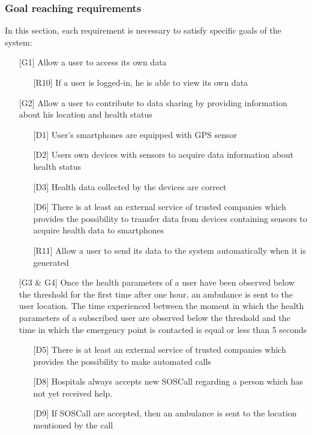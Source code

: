 \subsubsection{Goal reaching requirements}
\par
In this section, each requirement is necessary to satisfy specific goals of the system:
\begin{itemize}
\item[{[G1]}] Allow a user to access its own data
	\begin{itemize}
	\item[{[R10]}] If a user is logged-in, he is able to view its own data
	\end{itemize}
\item[{[G2]}] Allow a user to contribute to data sharing by providing information about his location and health status
	\begin{itemize}
	\item[{[D1]}]  User's smartphones are equipped with GPS sensor
	\item[{[D2]}] Users own devices with sensors to acquire data information about health status
	\item[{[D3]}] Health data collected by the devices are correct
	\item[{[D6]}] There is at least an external service of trusted companies which provides the possibility to transfer data from devices containing sensors to acquire health data to smartphones
	\item[{[R11]}] Allow a user to send its data to the system automatically when it is generated
	\end{itemize}
\item[{[G3 \& G4]}] Once the health parameters of a user have been observed 
below the threshold for the first time after one hour, an ambulance is sent to the user location. 
The time experienced between the moment in which the health parameters of a subscribed user are observed below the threshold and the time in which the emergency point is contacted is equal or less than 5 seconds
	\begin{itemize}
	\item[{[D5]}] There is at least an external service of trusted companies which provides the possibility to make automated calls
	\item[{[D8]}] Hospitals always accepts new SOSCall regarding a person which has not yet received help.
	\item[{[D9]}] If SOSCall are accepted, then an ambulance is sent to the location mentioned by the call

\end{itemize}
\end{itemize}
